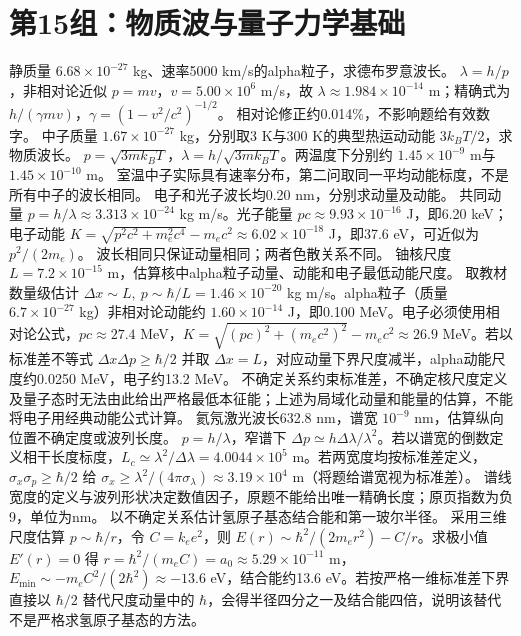 \section{第15组：物质波与量子力学基础}
\problemtext 静质量 $6.68\times10^{-27}$ kg、速率5000 km/s的alpha粒子，求德布罗意波长。
\workings $\lambda=h/p$，非相对论近似 $p=mv$，$v=5.00\times10^6$ m/s，故 $\lambda\approx1.984\times10^{-14}$ m；精确式为 $h/(\gamma mv)$，$\gamma=(1-v^2/c^2)^{-1/2}$。
\crosscheck 相对论修正约0.014\%，不影响题给有效数字。
\problemtext 中子质量 $1.67\times10^{-27}$ kg，分别取3 K与300 K的典型热运动动能 $3k_BT/2$，求物质波长。
\workings $p=\sqrt{3mk_BT}$，$\lambda=h/\sqrt{3mk_BT}$。两温度下分别约 $1.45\times10^{-9}$ m与 $1.45\times10^{-10}$ m。
\crosscheck 室温中子实际具有速率分布，第二问取同一平均动能标度，不是所有中子的波长相同。
\problemtext 电子和光子波长均0.20 nm，分别求动量及动能。
\workings 共同动量 $p=h/\lambda\approx3.313\times10^{-24}$ kg m/s。光子能量 $pc\approx9.93\times10^{-16}$ J，即6.20 keV；电子动能 $K=\sqrt{p^2c^2+m_e^2c^4}-m_ec^2\approx6.02\times10^{-18}$ J，即37.6 eV，可近似为 $p^2/(2m_e)$。
\crosscheck 波长相同只保证动量相同；两者色散关系不同。
\problemtext 铀核尺度 $L=7.2\times10^{-15}$ m，估算核中alpha粒子动量、动能和电子最低动能尺度。
\workings 取教材数量级估计 $\Delta x\sim L,\ p\sim\hbar/L=1.46\times10^{-20}$ kg m/s。alpha粒子（质量 $6.7\times10^{-27}$ kg）非相对论动能约 $1.60\times10^{-14}$ J，即0.100 MeV。电子必须使用相对论公式，$pc\approx27.4$ MeV，$K=\sqrt{(pc)^2+(m_ec^2)^2}-m_ec^2\approx26.9$ MeV。若以标准差不等式 $\Delta x\Delta p\ge\hbar/2$ 并取 $\Delta x=L$，对应动量下界尺度减半，alpha动能尺度约0.0250 MeV，电子约13.2 MeV。
\crosscheck 不确定关系约束标准差，不确定核尺度定义及量子态时无法由此给出严格最低本征能；上述为局域化动量和能量的估算，不能将电子用经典动能公式计算。
\problemtext 氦氖激光波长632.8 nm，谱宽 $10^{-9}$ nm，估算纵向位置不确定度或波列长度。
\workings $p=h/\lambda$，窄谱下 $\Delta p\simeq h\Delta\lambda/\lambda^2$。若以谱宽的倒数定义相干长度标度，$L_c\simeq\lambda^2/\Delta\lambda=4.0044\times10^5$ m。若两宽度均按标准差定义，$\sigma_x\sigma_p\ge\hbar/2$ 给 $\sigma_x\ge\lambda^2/(4\pi\sigma_\lambda)\approx3.19\times10^4$ m（将题给谱宽视为标准差）。
\crosscheck 谱线宽度的定义与波列形状决定数值因子，原题不能给出唯一精确长度；原页指数为负9，单位为nm。
\problemtext 以不确定关系估计氢原子基态结合能和第一玻尔半径。
\workings 采用三维尺度估算 $p\sim\hbar/r$，令 $C=k_ee^2$，则 $E(r)\sim\hbar^2/(2m_er^2)-C/r$。求极小值 $E'(r)=0$ 得 $r=\hbar^2/(m_e C)=a_0\approx5.29\times10^{-11}$ m，$E_{\min}\sim-m_e C^2/(2\hbar^2)\approx-13.6$ eV，结合能约13.6 eV。若按严格一维标准差下界直接以 $\hbar/2$ 替代尺度动量中的 $\hbar$，会得半径四分之一及结合能四倍，说明该替代不是严格求氢原子基态的方法。
